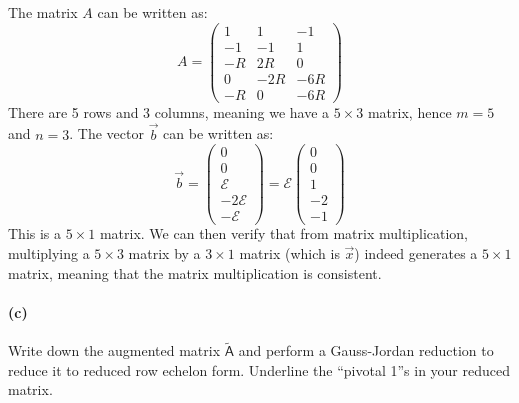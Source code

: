 \documentclass{article}
\begin{document}
\begin{solution}
	The matrix $A$ can be written as: 
	\[
		A = \begin{pmatrix} 1 & 1 & -1\\ -1 &-1 & 1\\ -R & 2R & 0 \\ 0 & -2R & -6R\\ -R & 0 & -6R \end{pmatrix} 
	\] 
	There are 5 rows and 3 columns, meaning we have a $5 \times 3$ matrix, hence $m = 5$ and $n = 3$. The vector
	$\vec b$ can be written as: 
	\[
	\vec b = \begin{pmatrix} 0 \\ 0 \\ \mathcal E \\ -2 \mathcal E\\-\mathcal E \end{pmatrix} = \mathcal E
	\begin{pmatrix} 0 \\ 0 \\ 1 \\ -2 \\ -1  \end{pmatrix} 
	\] 
	This is a $5 \times 1$ matrix. We can then verify that from matrix multiplication, multiplying a $5\times 3$
	matrix by a $3 \times 1$ matrix (which is $\vec x$) indeed generates a $5 \times 1$ matrix, meaning that 
	the matrix multiplication is consistent.
	
\end{solution}

\paragraph{(c)}
Write down the augmented matrix $\tilde{\mathsf{A}}$ and perform a Gauss-Jordan reduction to reduce it to reduced row echelon form. Underline the ``pivotal 1''s in your
reduced matrix.
\end{document}
